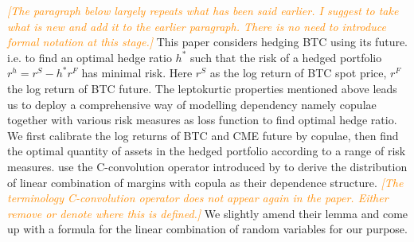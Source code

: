 \documentclass[11pt,a4paper,english]{article}
\providecommand{\natp}[1]{\textcolor{darkorange}{#1}}
\begin{document}
\natp{\em [The paragraph below largely repeats what has been said
  earlier. I suggest to take what is new and add it to the earlier
  paragraph. There is no need to introduce formal notation at this stage.]}
This paper considers hedging BTC using its future. %
i.e. to find an optimal hedge ratio $h^*$ such that the risk of a hedged portfolio $r^h = r^S - h^*r^F$ has
minimal risk.
Here $r^S$ as the log return of BTC spot price, $r^F$ the log return of BTC future.
The leptokurtic properties mentioned above leads us to deploy a comprehensive way of modelling dependency namely copulae together with various risk measures as loss function to find optimal hedge ratio.
We first calibrate the log returns of BTC and CME future by copulae,
then find the optimal quantity of assets in the hedged portfolio according to a range of risk measures.
\citet{barbi2014copula} use the C-convolution operator introduced by \citet{cherubini2011copula} to derive the distribution
of linear combination of margins with copula as their dependence
structure. \natp{\em [The terminology C-convolution operator does not
  appear again in the paper. Either remove or denote where this is defined.]}
We slightly amend their lemma and come up with a formula for the linear combination of random variables for our purpose.\medskip
%
%
\end{document}
